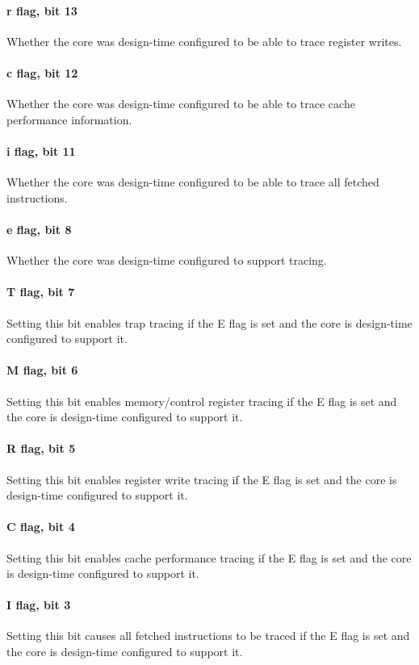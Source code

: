 \paragraph*{r flag, bit 13}
Whether the core was design-time configured to be able to trace register writes.
\paragraph*{c flag, bit 12}
Whether the core was design-time configured to be able to trace cache
performance information.
\paragraph*{i flag, bit 11}
Whether the core was design-time configured to be able to trace all fetched
instructions.
\paragraph*{e flag, bit 8}
Whether the core was design-time configured to support tracing.
\paragraph*{T flag, bit 7}
Setting this bit enables trap tracing if the E flag is set and the core is
design-time configured to support it.
\paragraph*{M flag, bit 6}
Setting this bit enables memory/control register tracing if the E flag is set
and the core is design-time configured to support it.
\paragraph*{R flag, bit 5}
Setting this bit enables register write tracing if the E flag is set and the
core is design-time configured to support it.
\paragraph*{C flag, bit 4}
Setting this bit enables cache performance tracing if the E flag is set and the
core is design-time configured to support it.
\paragraph*{I flag, bit 3}
Setting this bit causes all fetched instructions to be traced if the E flag is
set and the core is design-time configured to support it.
